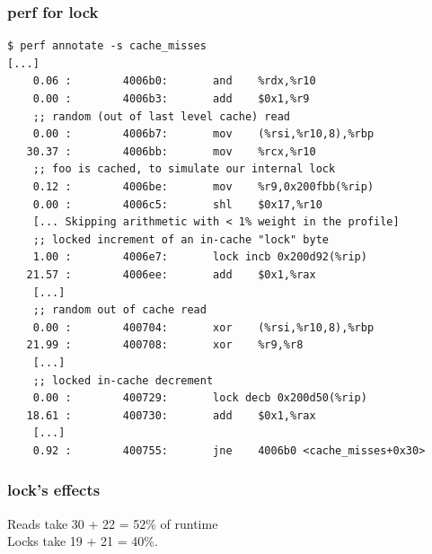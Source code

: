 \documentclass[aspectratio=43]{beamer}
\newenvironment{changemargin}[1]{%
  \begin{list}{}{%
    \setlength{\topsep}{0pt}%
    \setlength{\leftmargin}{#1}%
    \setlength{\rightmargin}{1em}
    \setlength{\listparindent}{\parindent}%
    \setlength{\itemindent}{\parindent}%
    \setlength{\parsep}{\parskip}%
  }%
  \item[]}{\end{list}}
\begin{document}
\begin{frame}[fragile]
  \frametitle{perf for lock}

    \begin{lstlisting}
$ perf annotate -s cache_misses
[...]
    0.06 :        4006b0:       and    %rdx,%r10
    0.00 :        4006b3:       add    $0x1,%r9
    ;; random (out of last level cache) read
    0.00 :        4006b7:       mov    (%rsi,%r10,8),%rbp
   30.37 :        4006bb:       mov    %rcx,%r10
    ;; foo is cached, to simulate our internal lock
    0.12 :        4006be:       mov    %r9,0x200fbb(%rip)
    0.00 :        4006c5:       shl    $0x17,%r10
    [... Skipping arithmetic with < 1% weight in the profile]
    ;; locked increment of an in-cache "lock" byte
    1.00 :        4006e7:       lock incb 0x200d92(%rip)
   21.57 :        4006ee:       add    $0x1,%rax
    [...]
    ;; random out of cache read
    0.00 :        400704:       xor    (%rsi,%r10,8),%rbp
   21.99 :        400708:       xor    %r9,%r8
    [...]
    ;; locked in-cache decrement
    0.00 :        400729:       lock decb 0x200d50(%rip)
   18.61 :        400730:       add    $0x1,%rax
    [...]
    0.92 :        400755:       jne    4006b0 <cache_misses+0x30>
    \end{lstlisting}


\end{frame}

\begin{frame}
  \frametitle{lock's effects}

  \begin{changemargin}{2cm}
    Reads take 30 + 22 = 52\% of runtime\\
    Locks take 19 + 21 = 40\%.
  \end{changemargin}

\end{frame}
\end{document}
